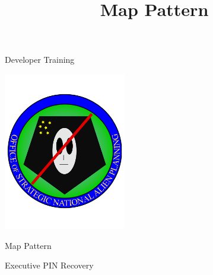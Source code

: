 \documentclass[xcolor=dvipsnames]{beamer}
\begin{document}
	\title[Map Pattern]{Map Pattern}
	\author[]{\className}
	\institute[\className]{\departmentName}
	\date{} 


	\begin{frame}
		\maketitle
	\end{frame}
	
	\begin{frame}{Developer Training}
		\begin{center}
			\includegraphics[width=0.4\textwidth]{images/OSNAP_logo} 
			
			Map Pattern
			
			Executive PIN Recovery
		\end{center}
	\end{frame}
	
\end{document}
